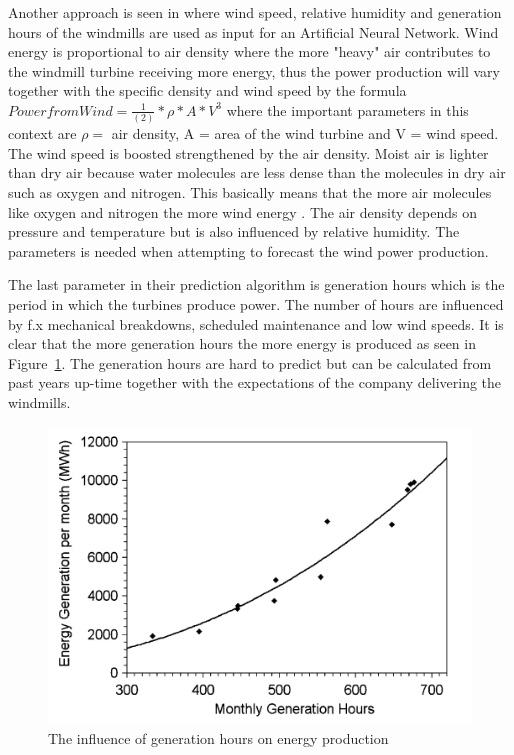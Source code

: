 Another approach is seen in \cite{WindPowerGenerationUsingANN} where wind speed, relative humidity and generation hours of the windmills are used as input for an Artificial Neural Network. Wind energy is proportional to air density where the more "heavy" air contributes to the windmill turbine receiving more energy, thus the power production will vary together with the specific density and wind speed by the formula $Power from Wind=\frac{1}{(2)}*\rho*A*V^3$ where the important parameters in this context are $\rho = $ air density, A = area of the wind turbine and V = wind speed. The wind speed is boosted strengthened by the air density. Moist air is lighter than dry air because water molecules are less dense than the molecules in dry air such as oxygen and nitrogen. This basically means that the more air molecules like oxygen and nitrogen the more wind energy \cite{AirDensityInForecast}.
The air density depends on pressure and temperature but is also influenced by relative humidity. The parameters is needed when attempting to forecast the wind power production.

The last parameter in their prediction algorithm is generation hours which is the period in which the turbines produce power. The number of hours are influenced by f.x mechanical breakdowns, scheduled maintenance and low wind speeds. It is clear that the more generation hours the more energy is produced as seen in Figure~\ref{fig:energyGenerationFromHours}. The generation hours are hard to predict but can be calculated from past years up-time together with the expectations of the company delivering the windmills.  

\begin{figure}[h!]
\centering
\includegraphics[width=0.8\linewidth,natwidth=898,natheight=587]{billeder/GenerationHourVSGeneration.png}
\caption{The influence of generation hours on energy production \cite{WindPowerGenerationUsingANN}}
\label{fig:energyGenerationFromHours}
\end{figure} 


